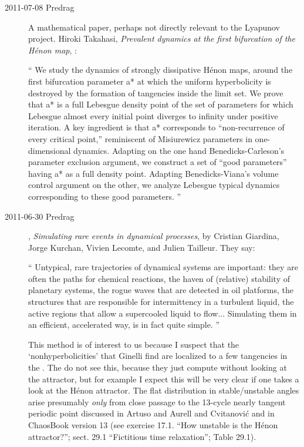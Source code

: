 \begin{description}
\item[2011-07-08 Predrag]
A mathematical paper, perhaps not directly relevant to the Lyapunov
project.
Hiroki Takahasi,
\emph{Prevalent dynamics at the first bifurcation of the H\'enon map},
:

``
We study the dynamics of strongly dissipative H\'enon maps, around the
first bifurcation parameter a* at which the uniform hyperbolicity is
destroyed by the formation of tangencies inside the limit set. We prove
that a* is a full Lebesgue density point of the set of parameters for
which Lebesgue almost every initial point diverges to infinity under
positive iteration. A key ingredient is that a* corresponds to
``non-recurrence of every critical point,'' reminiscent of Misiurewicz
parameters in one-dimensional dynamics. Adapting on the one hand
Benedicks-Carleson's parameter exclusion argument, we construct a set
of ``good parameters'' having a* as a full density point. Adapting
Benedicks-Viana's volume control argument on the other, we analyze
Lebesgue typical dynamics corresponding to these good parameters.
''

\item[2011-06-30 Predrag] ,
\emph{Simulating rare events in dynamical processes},
by Cristian Giardina, Jorge Kurchan, Vivien Lecomte,
and Julien Tailleur. They say:

``
Untypical, rare trajectories of dynamical systems are important: they are
often the paths for chemical reactions, the haven of (relative) stability
of planetary systems, the rogue waves that are detected in oil platforms,
the structures that are responsible for intermittency in a turbulent
liquid, the active regions that allow a supercooled liquid to flow...
Simulating them in an efficient, accelerated way, is in fact quite
simple.
''

This method is of interest to us because I suspect that the
`nonhyperbolicities' that Ginelli\etal{} find are
localized to a few tangencies in the \statesp. The do not see this,
because they just compute without looking at the attractor, but for
example I expect this will be very clear if one takes a look at the
H\'enon attractor. The flat distribution in stable/unstable angles arise
presumably {\em only} from close passage to the 13-cycle nearly tangent
periodic point discussed in Artuso and Aurell and
Cvitanovi{\'{c}} and in ChaosBook version 13 (see exercise
17.1. ``How unstable is the H\'enon attractor?''; sect. 29.1 ``Fictitious
time relaxation''; Table 29.1).


\end{description}
